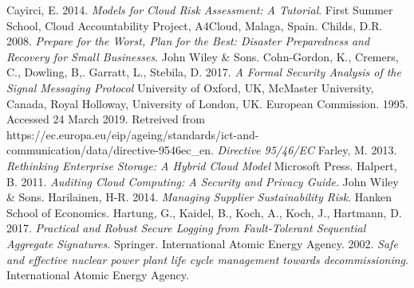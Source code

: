 \documentclass{article}
\begin{document}
\begin{thebibliography}{9}
        Cayirci, E.
	2014.
        \textit{Models for Cloud Risk Assessment: A Tutorial}.
        First Summer School, Cloud Accountability Project, A4Cloud, Malaga, Spain.
        Childs, D.R.
        2008.
        \textit{Prepare for the Worst, Plan for the Best: Disaster Preparedness and Recovery for Small Businesses}.
	John Wiley \& Sons.
        Cohn-Gordon, K.,
        Cremers, C.,
        Dowling, B,.
        Garratt, L.,
        Stebila, D.
        2017.
        \textit{A Formal Security Analysis of the Signal Messaging Protocol}
	University of Oxford, UK,
        McMaster University, Canada,
        Royal Holloway, University of London, UK.
	European Commission.
	1995.
	Accessed 24 March 2019. Retreived from https://ec.europa.eu/eip/ageing/standards/ict-and-communication/data/directive-9546ec\_en.
	\textit{Directive 95/46/EC}
        Farley, M.
        2013.
	\textit{Rethinking Enterprise Storage: A Hybrid Cloud Model}
        Microsoft Press.
        Halpert, B.
        2011.
	\textit{Auditing Cloud Computing: A Security and Privacy Guide}.
	John Wiley \& Sons.
	Harilainen, H-R.
	2014.
	\textit{Managing Supplier Sustainability Risk}.
	Hanken School of Economics.
        Hartung, G.,
        Kaidel, B.,
        Koch, A.,
        Koch, J.,
        Hartmann, D.
        2017.
	\textit{Practical and Robust Secure Logging from Fault-Tolerant Sequential Aggregate Signatures}.
        Springer.
	International Atomic Energy Agency.
	2002.
	\textit{Safe and effective nuclear power plant life cycle management towards decommissioning}.
	International Atomic Energy Agency.


\end{thebibliography}
\end{document}
